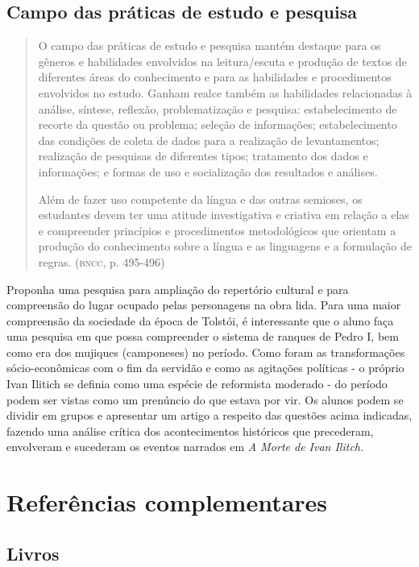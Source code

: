 \documentclass{extarticle}
\begin{document}
\subsection{Campo das práticas de estudo e pesquisa}

\begin{quote}
O campo das práticas de estudo e pesquisa mantém destaque para os
gêneros e habilidades envolvidos na leitura/escuta e produção de textos
de diferentes áreas do conhecimento e para as habilidades e
procedimentos envolvidos no estudo. Ganham realce também as habilidades
relacionadas à análise, síntese, reflexão, problematização e pesquisa:
estabelecimento de recorte da questão ou problema; seleção de
informações; estabelecimento das condições de coleta de dados para a
realização de levantamentos; realização de pesquisas de diferentes
tipos; tratamento dos dados e informações; e formas de uso e
socialização dos resultados e análises.

Além de fazer uso competente da língua e das outras semioses, os
estudantes devem ter uma atitude investigativa e criativa em relação a
elas e compreender princípios e procedimentos metodológicos que orientam
a produção do conhecimento sobre a língua e as linguagens e a formulação
de regras. (\textsc{bncc}, p. 495-496)
\end{quote}

Proponha uma pesquisa para ampliação do repertório cultural e para
compreensão do lugar ocupado pelas personagens na obra lida. Para uma
maior compreensão da sociedade da época de Tolstói, é interessante que
o aluno faça uma pesquisa em que possa compreender o sistema de
ranques de Pedro I, bem como era dos mujiques (camponeses) no período.
Como foram as transformações sócio-econômicas com o fim da servidão e
como as agitações políticas - o próprio Ivan Ilitich se definia como
uma espécie de reformista moderado - do período podem ser vistas como
um prenúncio do que estava por vir. Os alunos podem se dividir em
grupos e apresentar um artigo a respeito das questões acima indicadas,
fazendo uma análise crítica dos acontecimentos históricos que
precederam, envolveram e sucederam os eventos narrados em \emph{A
Morte de Ivan Ilitch.}

\section{Referências complementares}

\subsection{Livros}
\end{document}
